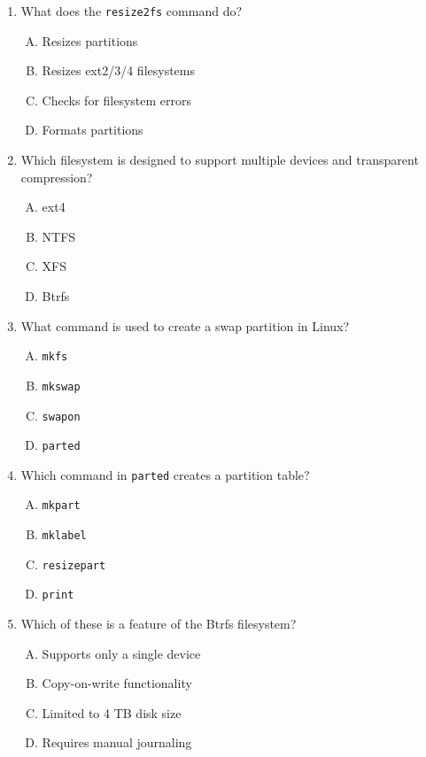\documentclass[a4paper]{report}
\begin{document}
\begin{enumerate}[1.]
    \item What does the \texttt{resize2fs} command do?  
    \begin{enumerate}[A)]
        \item Resizes partitions  
        \item Resizes ext2/3/4 filesystems  
        \item Checks for filesystem errors  
        \item Formats partitions  
    \end{enumerate}

    \item Which filesystem is designed to support multiple devices and transparent compression?  
    \begin{enumerate}[A)]
        \item ext4  
        \item NTFS  
        \item XFS  
        \item Btrfs  
    \end{enumerate}

    \item What command is used to create a swap partition in Linux?  
    \begin{enumerate}[A)]
        \item \texttt{mkfs}  
        \item \texttt{mkswap}  
        \item \texttt{swapon}  
        \item \texttt{parted}  
    \end{enumerate}

    \item Which command in \texttt{parted} creates a partition table?  
    \begin{enumerate}[A)]
        \item \texttt{mkpart}  
        \item \texttt{mklabel}  
        \item \texttt{resizepart}  
        \item \texttt{print}  
    \end{enumerate}

    \item Which of these is a feature of the Btrfs filesystem?  
    \begin{enumerate}[A)]
        \item Supports only a single device  
        \item Copy-on-write functionality  
        \item Limited to 4 TB disk size  
        \item Requires manual journaling  
    \end{enumerate}


\end{enumerate}
\end{document}
